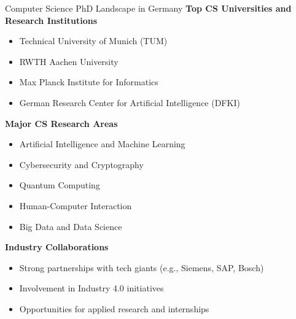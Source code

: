 \documentclass[aspectratio=169,10pt]{beamer}
\begin{document}
\begin{frame}{Computer Science PhD Landscape in Germany}
    \textbf{Top CS Universities and Research Institutions}
    \begin{itemize}
        \item Technical University of Munich (TUM)
        \item RWTH Aachen University
        \item Max Planck Institute for Informatics
        \item German Research Center for Artificial Intelligence (DFKI)
    \end{itemize}
    
    \textbf{Major CS Research Areas}
    \begin{itemize}
        \item Artificial Intelligence and Machine Learning
        \item Cybersecurity and Cryptography
        \item Quantum Computing
        \item Human-Computer Interaction
        \item Big Data and Data Science
    \end{itemize}
    
    \textbf{Industry Collaborations}
    \begin{itemize}
        \item Strong partnerships with tech giants (e.g., Siemens, SAP, Bosch)
        \item Involvement in Industry 4.0 initiatives
        \item Opportunities for applied research and internships
    \end{itemize}
\end{frame}
\end{document}
